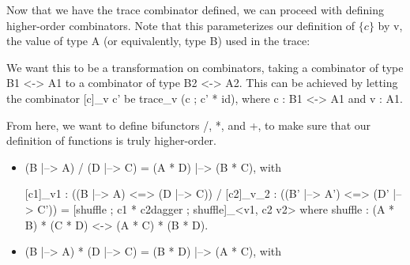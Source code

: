\documentclass{llncs}
\begin{document}
Now that we have the trace combinator defined, we can proceed with defining
higher-order combinators. Note that this parameterizes our definition of
$\{c\}$ by {{v}}, the value of type {{A}} (or equivalently, type {{B}}) used
in the trace:


\noindent
We want this to be a transformation on combinators, taking a combinator of type
{{B1 <-> A1}} to a combinator of type {{B2 <-> A2}}. This can be achieved by
letting the combinator {{{[c]}_v c'}} be {{trace_v (c ; c' * id)}}, where
{{c : B1 <-> A1}} and {{v : A1}}.

From here, we want to define bifunctors {{/}}, {{*}}, and {{+}}, to make sure
that our definition of functions is truly higher-order.

\begin{itemize}

\item {{(B |--> A) / (D |--> C) = (A * D) |--> (B * C)}}, with

{{{[c1]}_{v1} : ((B |--> A) <=> (D |--> C)) / {[c2]}_{v_2} : ((B' |--> A') <=> (D' |--> C')) = {[shuffle ; c1 * c2dagger ; shuffle]}_{<v1, c2 v2>}}}
where
{{shuffle : (A * B) * (C * D) <-> (A * C) * (B * D)}}.

\item {{(B |--> A) * (D |--> C) = (B * D) |--> (A * C)}}, with

\end{itemize}
\end{document}
